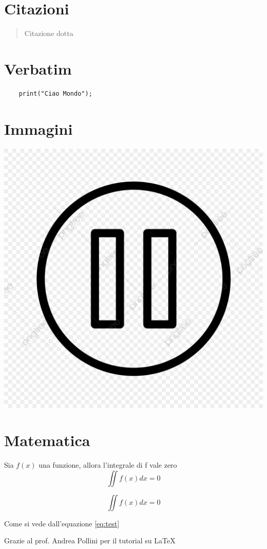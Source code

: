 \documentclass{article}
\begin{document}
\section{Citazioni}

\begin{quote}
    Citazione dotta
\end{quote}

\section{Verbatim}

\begin{verbatim}
    print("Ciao Mondo");
\end{verbatim}

\section{Immagini}

\includegraphics[width=\textwidth]{prova.jpg}

\section{Matematica}

Sia $f(x)$ una funzione, allora l'integrale di f vale zero
$$\iint f(x)dx = 0$$

\begin{equation}
    \iint f(x)dx = 0\label{eq:test}
\end{equation}

Come si vede dall'equazione \ref{eq:test}

Grazie al prof. Andrea Pollini per il tutorial su LaTeX
\end{document}
